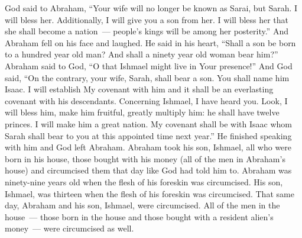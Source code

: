 \begin{inparaenum}
   God said to Abraham, ``Your wife will no longer be known as Sarai, but Sarah.%
   I will bless her. Additionally, I will give you a son from her. I will bless her that she shall become a nation~--- people's kings will be among her posterity.''%
   And Abraham fell on his face and laughed. He said in his heart, ``Shall a son be born to a hundred year old man? And shall a ninety year old woman bear him?''%
   Abraham said to God, ``O that Ishmael might live in Your presence!''%
   And God said, ``On the contrary, your wife, Sarah, shall bear a son. You shall name him Isaac. I will establish My covenant with him and it shall be an everlasting covenant with his descendants.%
   Concerning Ishmael, I have heard you. Look, I will bless him, make him fruitful, greatly multiply him: he shall have twelve princes. I will make him a great nation.%
   My covenant shall be with Isaac whom Sarah shall bear to you at this appointed time next year.''%
   He finished speaking with him and God left Abraham.%
   Abraham took his son, Ishmael, all who were born in his house, those bought with his money (all of the men in Abraham's house) and circumcised them that day like God had told him to.%
   Abraham was ninety-nine years old when the flesh of his foreskin was circumcised.%
   His son, Ishmael, was thirteen when the flesh of his foreskin was circumcised.%
   That same day, Abraham and his son, Ishmael, were circumcised.%
   All of the men in the house~--- those born in the house and those bought with a resident alien's money~--- were circumcised as well.%
\end{inparaenum}
